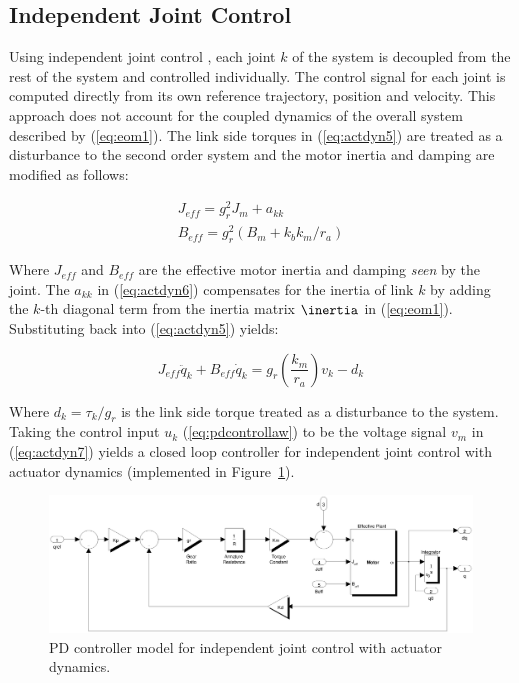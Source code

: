 \subsection{Independent Joint Control} %
\label{sub:independent_joint_control}


Using independent joint control \cite{Sciavicco2001}, each joint $k$ of the system is decoupled from the rest of the system and controlled individually. The control signal for each joint is computed directly from its own reference trajectory, position and velocity. This approach does not account for the coupled dynamics of the overall system described by (\ref{eq:eom1}). The link side torques in (\ref{eq:actdyn5}) are treated as a disturbance to the second order system and the motor inertia and damping are modified as follows: 

\begin{equation}
	\begin{array}{l}
		{J_{eff}} = g_r^2{J_m} + {a_{kk}}\\
		{B_{eff}} = g_r^2({B_m} + {k_b}{k_m}/{r_a})
	\end{array}
	\label{eq:actdyn6}
\end{equation}

Where ${J_{eff}}$ and ${B_{eff}}$ are the effective motor inertia and damping \emph{seen} by the joint. The ${a_{kk}}$ in (\ref{eq:actdyn6}) compensates for the inertia of link $k$ by adding the $k$-th diagonal term from the inertia matrix $\inertia$ in (\ref{eq:eom1}). Substituting back into (\ref{eq:actdyn5}) yields: 

\begin{equation}
	{J_{eff}}{\ddot q_k} + {B_{eff}}{\dot q_k} = g_r^{}\left( {\frac{{{k_m}}}{{{r_a}}}} \right){v_k} - {d_k}
	\label{eq:actdyn7}
\end{equation}

Where ${d_k} = \tau _k / g _r$ is the link side torque treated as a disturbance to the system. Taking the control input $u _k$ (\ref{eq:pdcontrollaw}) to be the voltage signal $v _m$ in (\ref{eq:actdyn7}) yields a closed loop controller for independent joint control with actuator dynamics (implemented in Figure~\ref{fig:pdmotorcontroller}).

\begin{figure}[!h]
	\centering
    \includegraphics[scale=0.5]{fig/experiments/pdmotorcontroller.eps} 
  	\caption{PD controller model for independent joint control with actuator dynamics.}
	\label{fig:pdmotorcontroller}
\end{figure}

